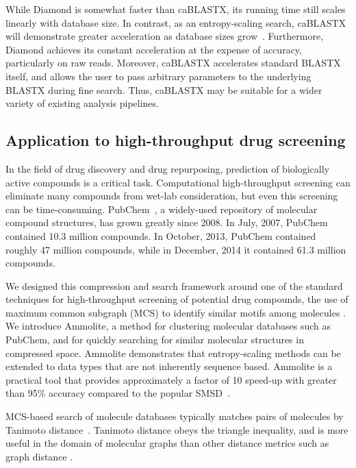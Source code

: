 \documentclass[review,preprint,12pt]{elsarticle}
\renewcommand{\cite}{\citep} %
\theoremstyle{definition}
\theoremstyle{remark}
\numberwithin{equation}{section}
\begin{document}
While Diamond is somewhat faster than caBLASTX, its running time still scales
linearly with database size.
In contrast, as an entropy-scaling search, caBLASTX will demonstrate greater
acceleration as database sizes grow~\cite{daniels2013compressive}.
Furthermore, Diamond achieves its constant acceleration at the expense of 
accuracy, particularly on raw reads.
Moreover, caBLASTX accelerates standard BLASTX itself, and allows the
user to pass arbitrary parameters to the underlying BLASTX during fine search.
Thus, caBLASTX may be suitable for a wider variety of existing analysis 
pipelines.

\subsection{Application to high-throughput drug screening}

In the field of drug discovery and drug repurposing, prediction of biologically 
active compounds is a critical task. 
Computational high-throughput screening can eliminate many compounds from 
wet-lab consideration, but even this screening can be time-consuming.
PubChem~\cite{bolton2008pubchem}, a widely-used repository of molecular compound 
structures, 
has grown greatly since 2008. 
In July, 2007, PubChem contained 10.3 million compounds.
In October, 2013, PubChem contained roughly 47 million compounds, while
in December, 2014 it contained 61.3 million compounds.

We designed this compression and search framework around one of the standard 
techniques for high-throughput screening of potential drug compounds, the use 
of maximum common subgraph (MCS) to identify similar motifs among molecules \cite{cao2008maximum, rahman2009small}.
We introduce Ammolite, a method for clustering molecular databases such as 
PubChem, and for quickly searching for 
similar molecular structures in compressed space.
Ammolite demonstrates that entropy-scaling methods can be extended to data types that are not inherently sequence based.
Ammolite is a practical 
tool that provides approximately a factor of 10 speed-up with greater than 95\% accuracy compared to the popular SMSD~\cite{rahman2009small}.

MCS-based search of molecule databases typically matches pairs of molecules by 
Tanimoto distance~\cite{rahman2009small}. 
Tanimoto distance obeys the triangle inequality, and is more useful in the 
domain of molecular graphs than other
distance metrics such as graph distance \cite{bunke1998graph}.
\end{document}
